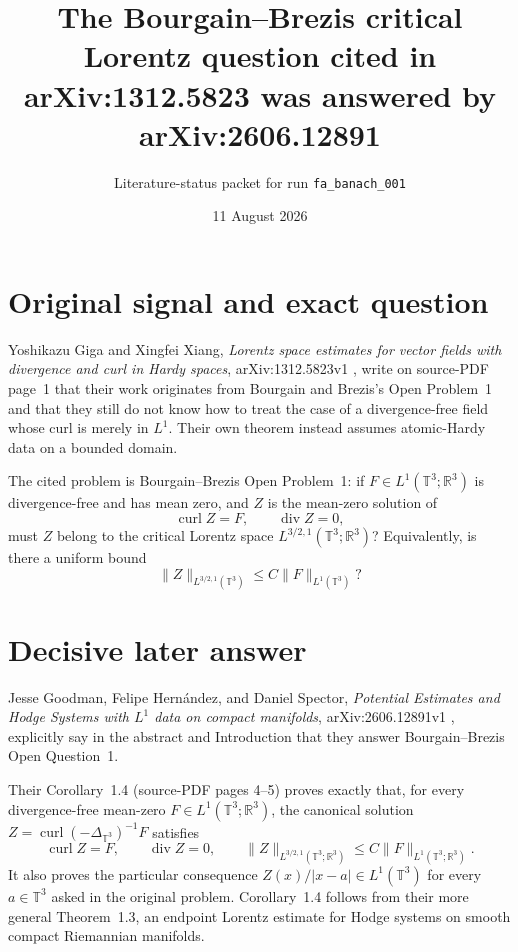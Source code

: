 \documentclass[11pt]{article}
\title{The Bourgain--Brezis critical Lorentz question cited in\\
arXiv:1312.5823 was answered by arXiv:2606.12891}
\author{Literature-status packet for run \texttt{fa\_banach\_001}}
\date{11 August 2026}
\DeclareMathOperator{\curl}{curl}
\DeclareMathOperator{\diver}{div}
\begin{document}
\maketitle

\begin{center}
\end{center}

\section*{Original signal and exact question}

Yoshikazu Giga and Xingfei Xiang, \emph{Lorentz space estimates for vector
fields with divergence and curl in Hardy spaces}, arXiv:1312.5823v1
\cite{GX}, write on source-PDF page~1 that their work originates from
Bourgain and Brezis's Open Problem~1 and that they still do not know how to
treat the case of a divergence-free field whose curl is merely in $L^1$.
Their own theorem instead assumes atomic-Hardy data on a bounded domain.

The cited problem is Bourgain--Brezis Open Problem~1: if
$F\in L^1(\mathbb T^3;\mathbb R^3)$ is divergence-free and has mean zero, and
$Z$ is the mean-zero solution of
\[
  \curl Z=F,\qquad \diver Z=0,
\]
must $Z$ belong to the critical Lorentz space
$L^{3/2,1}(\mathbb T^3;\mathbb R^3)$?  Equivalently, is there a uniform bound
\[
  \|Z\|_{L^{3/2,1}(\mathbb T^3)}\le C\|F\|_{L^1(\mathbb T^3)}?
\]

\section*{Decisive later answer}

Jesse Goodman, Felipe Hern\'andez, and Daniel Spector,
\emph{Potential Estimates and Hodge Systems with $L^1$ data on compact
manifolds}, arXiv:2606.12891v1 \cite{GHS}, explicitly say in the abstract and
Introduction that they answer Bourgain--Brezis Open Question~1.

Their Corollary~1.4 (source-PDF pages 4--5) proves exactly that, for every
divergence-free mean-zero
$F\in L^1(\mathbb T^3;\mathbb R^3)$, the canonical solution
$Z=\curl(-\Delta_{\mathbb T^3})^{-1}F$ satisfies
\[
 \curl Z=F,\qquad \diver Z=0,\qquad
 \|Z\|_{L^{3/2,1}(\mathbb T^3;\mathbb R^3)}
 \le C\|F\|_{L^1(\mathbb T^3;\mathbb R^3)}.
\]
It also proves the particular consequence
$Z(x)/|x-a|\in L^1(\mathbb T^3)$ for every $a\in\mathbb T^3$ asked in the
original problem.  Corollary~1.4 follows from their more general
Theorem~1.3, an endpoint Lorentz estimate for Hodge systems on smooth compact
Riemannian manifolds.
\end{document}
